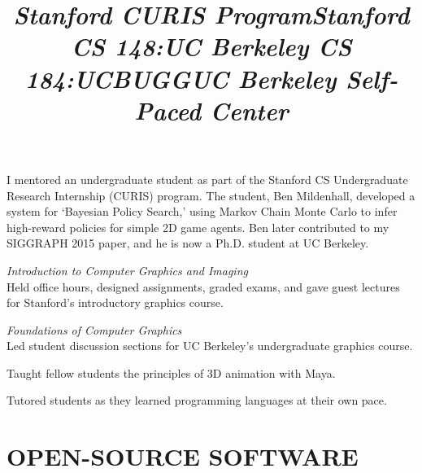 \documentclass[line,margin]{res}
\begin{document}
\begin{resume}
\title{\emph{Stanford CURIS Program}}
\begin{position}
I mentored an undergraduate student as part of the Stanford CS Undergraduate Research Internship (CURIS) program. The student, Ben Mildenhall, developed a system for `Bayesian Policy Search,' using Markov Chain Monte Carlo to infer high-reward policies for simple 2D game agents. Ben later contributed to my SIGGRAPH 2015 paper, and he is now a Ph.D. student at UC Berkeley.
\end{position}

\title{\emph{Stanford CS 148:}}
\begin{position}
\emph{Introduction to Computer Graphics and Imaging}\\
Held office hours, designed assignments, graded exams, and gave guest lectures for Stanford's introductory graphics course.
\end{position}

\title{\emph{UC Berkeley CS 184:}}
\begin{position}
\emph{Foundations of Computer Graphics}\\
Led student discussion sections for UC Berkeley's undergraduate graphics course.
\end{position}

\title{\emph{UCBUGG}}
\begin{position}
Taught fellow students the principles of 3D animation with Maya.
\end{position}

\title{\emph{UC Berkeley Self-Paced Center}}
\begin{position}
Tutored students as they learned programming languages at their own pace.
\end{position}




\section{OPEN-SOURCE SOFTWARE}


\end{resume}
\end{document}
